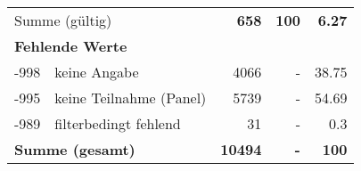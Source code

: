 \begin{longtable}{lXrrr}
     \midrule
     \multicolumn{2}{l}{Summe (gültig)} &
       \textbf{\num{658}} &
     \textbf{100} &
       \textbf{\num[round-mode=places,round-precision=2]{6,27}} \\
     \multicolumn{5}{l}{\textbf{Fehlende Werte}}\\
       -998 &
       keine Angabe &
         \num{4066} &
        - &
         \num[round-mode=places,round-precision=2]{38,75} \\
       -995 &
       keine Teilnahme (Panel) &
         \num{5739} &
        - &
         \num[round-mode=places,round-precision=2]{54,69} \\
       -989 &
       filterbedingt fehlend &
         \num{31} &
        - &
         \num[round-mode=places,round-precision=2]{0,3} \\
     \midrule
     \multicolumn{2}{l}{\textbf{Summe (gesamt)}} &
          \textbf{\num{10494}} &
        \textbf{-} &
        \textbf{100} \\
     \bottomrule
     \end{longtable}
     
